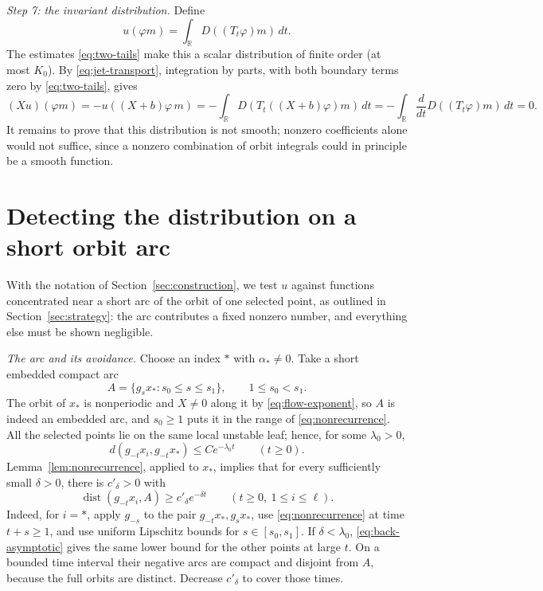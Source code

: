 \documentclass[11pt]{article}
\theoremstyle{remark}
\newcommand{\R}{\mathbb R}
\newcommand{\dist}{\operatorname{dist}}
\begin{document}
\emph{Step 7: the invariant distribution.}
Define
\begin{equation}\label{eq:invariant-u}
 u(\varphi m)=\int_{\R}D((T_t\varphi)m)\,dt.
\end{equation}
The estimates \eqref{eq:two-tails} make this a scalar distribution of
finite order (at most \(K_0\)).
By \eqref{eq:jet-transport}, integration by parts, with both boundary
terms zero by \eqref{eq:two-tails}, gives
\begin{equation}\label{eq:Xu-zero}
 (Xu)(\varphi m)
  =-u((X+b)\varphi\,m)
  =-\int_{\R}D(T_t((X+b)\varphi)m)\,dt
  =-\int_{\R}\frac{d}{dt}D((T_t\varphi)m)\,dt=0.
\end{equation}
It remains to prove that this distribution is not smooth; nonzero
coefficients alone would not suffice, since a nonzero combination of
orbit integrals could in principle be a smooth function.

\section{Detecting the distribution on a short orbit arc}
\label{sec:detection}
With the notation of Section~\ref{sec:construction}, we test
\(u\) against functions concentrated near a short arc of the orbit of
one selected point, as outlined in Section~\ref{sec:strategy}: the
arc contributes a fixed nonzero number, and everything else must be
shown negligible.

\emph{The arc and its avoidance.}
Choose an index \(*\) with \(\alpha_*\ne0\).
Take a short embedded compact arc
\[
 A=\{g_sx_*:s_0\le s\le s_1\},\qquad 1\le s_0<s_1 .
\]
The orbit of \(x_*\) is nonperiodic and \(X\ne0\) along it by
\eqref{eq:flow-exponent}, so \(A\) is indeed
an embedded arc, and \(s_0\ge1\) puts it in the range of
\eqref{eq:nonrecurrence}.
All the selected points lie on the same local unstable leaf; hence, for
some \(\lambda_0>0\),
\begin{equation}\label{eq:back-asymptotic}
 d(g_{-t}x_i,g_{-t}x_*)\le Ce^{-\lambda_0t}
                           \qquad(t\ge0).
\end{equation}
Lemma~\ref{lem:nonrecurrence}, applied to \(x_*\), implies that for
every sufficiently small \(\delta>0\), there is \(c'_\delta>0\) with
\begin{equation}\label{eq:arc-avoid}
 \dist(g_{-t}x_i,A)\ge c'_\delta e^{-\delta t}
                   \qquad(t\ge0,\ 1\le i\le\ell).
\end{equation}
Indeed, for \(i=*\), apply \(g_{-s}\) to the pair
\(g_{-t}x_*,g_sx_*\), use \eqref{eq:nonrecurrence} at time \(t+s\ge1\),
and use uniform Lipschitz bounds for \(s\in[s_0,s_1]\).
If \(\delta<\lambda_0\), \eqref{eq:back-asymptotic} gives the same
lower bound for the other points at large \(t\).
On a bounded time interval their negative arcs are compact and
disjoint from \(A\), because the full orbits are distinct.
Decrease \(c'_\delta\) to cover those times.
\end{document}
